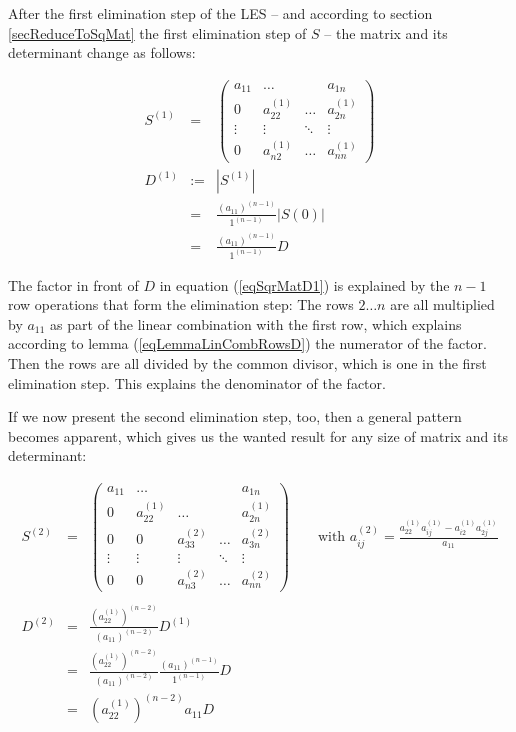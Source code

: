 After the first elimination step of the LES -- and according to section
\ref{secReduceToSqMat} the first elimination step of $S$ -- the matrix and
its determinant change as follows:

\begin{eqnarray}
S^{(1)} & = &
\left(
\begin{array}{cccc}
a_{11} & \ldots       &           & a_{1n}       \\
0      & a^{(1)}_{22} & \ldots    & a^{(1)}_{2n} \\
\vdots & \vdots       & \ddots    & \vdots       \\
0      & a^{(1)}_{n2} & \ldots & a^{(1)}_{nn}
\end{array}
\right) \nonumber \\
D^{(1)} & := & \left| S^{(1)} \right|                                 \nonumber \\
        & =  & \frac{\left(a_{11}\right)^{(n-1)}}{1^{(n-1)}} \left| S(0) \right| \nonumber \\
        & =  & \frac{\left(a_{11}\right)^{(n-1)}}{1^{(n-1)}} D \label{eqSqrMatD1}
\end{eqnarray}

\noindent
The factor in front of $D$ in equation (\ref{eqSqrMatD1}) is explained by
the $n-1$ row operations that form the elimination step: The rows $2
\ldots n$ are all multiplied by $a_{11}$ as part of the linear combination
with the first row, which explains according to lemma
(\ref{eqLemmaLinCombRowsD}) the numerator of the factor. Then the rows are
all divided by the common divisor, which is one in the first elimination
step. This explains the denominator of the factor.

If we now present the second elimination step, too, then a general pattern
becomes apparent, which gives us the wanted result for any size of matrix
and its determinant:

\begin{eqnarray}
S^{(2)} & = &
\left(
\begin{array}{ccccc}
a_{11} & \ldots       &              &        & a_{1n}       \\
0      & a^{(1)}_{22} & \ldots       &        & a^{(1)}_{2n} \\
0      & 0            & a^{(2)}_{33} & \ldots & a^{(2)}_{3n} \\
\vdots & \vdots       & \vdots       & \ddots & \vdots       \\
0      & 0            & a^{(2)}_{n3} & \ldots & a^{(2)}_{nn}
\end{array}
\right) \qquad \text{with }
a^{(2)}_{ij} = \frac{a^{(1)}_{22} a^{(1)}_{ij} - a^{(1)}_{i2} a^{(1)}_{2j}}{a_{11}} \\
\nonumber \\
D^{(2)} & = & \frac{\left(a^{(1)}_{22}\right)^{(n-2)}}{(a_{11})^{(n-2)}} D^{(1)} \nonumber \\
        & = & \frac{\left(a^{(1)}_{22}\right)^{(n-2)}}{(a_{11})^{(n-2)}}
              \frac{\left(a_{11}\right)^{(n-1)}}{1^{(n-1)}} D                    \nonumber \\
        & = & (a^{(1)}_{22})^{(n-2)} a_{11} D \label{eqSqrMatD2}
\end{eqnarray}

